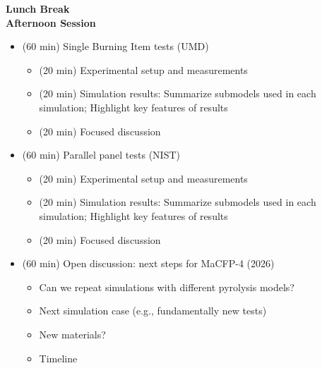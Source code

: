 \documentclass[12pt]{article}
\begin{document}
\textbf{Lunch Break}\\		

\textbf{Afternoon Session}
\begin{itemize}[noitemsep]
\item (60 min) Single Burning Item tests (UMD)
\begin{itemize}[noitemsep]
\item (20 min) Experimental setup and measurements
\item (20 min) Simulation results: Summarize submodels used in each simulation; Highlight key features of results
\item (20 min) Focused discussion 
\end{itemize}
\item (60 min) Parallel panel tests (NIST)
\begin{itemize}[noitemsep]
\item (20 min) Experimental setup and measurements
\item (20 min) Simulation results: Summarize submodels used in each simulation; Highlight key features of results
\item (20 min) Focused discussion 
\end{itemize}
\item (60 min) Open discussion: next steps for MaCFP-4 (2026)
\begin{itemize}[noitemsep]
\item Can we repeat simulations with different pyrolysis models?
\item Next simulation case (e.g., fundamentally new tests)
\item New materials?
\item Timeline
\end{itemize}
\end{itemize}
\end{document}
